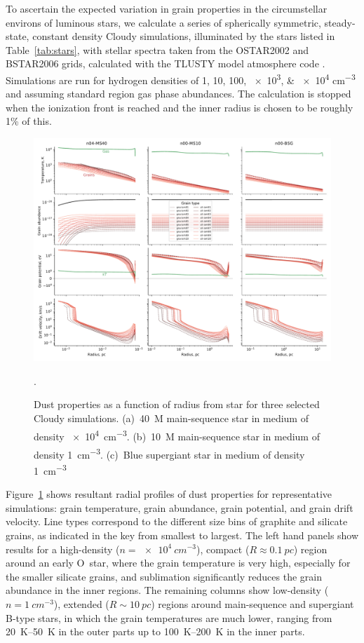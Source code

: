 To ascertain the expected variation in grain properties in the
circumstellar environs of luminous stars, we calculate a series of
spherically symmetric, steady-state, constant density Cloudy simulations,
illuminated by the stars listed in Table~\ref{tab:stars}, with stellar
spectra taken from the OSTAR2002 and BSTAR2006 grids, calculated with
the TLUSTY model atmosphere code \citep{Lanz:2003a, Lanz:2007a}.
Simulations are run for hydrogen densities of
\numlist{1;10;100;e3;e4} \si{cm^{-3}} and assuming standard \hii{} region
gas phase abundances.  The calculation is stopped when the ionization
front is reached and the inner radius is chosen to be roughly 1\% of this. 



\begin{figure}
  \includegraphics[width=\linewidth]{figs/multi-dustprops}
  \caption{Dust properties as a function of radius from star for three
    selected Cloudy simulations. (a)~\SI{40}{M_\odot} main-sequence star in
    medium of density \SI{e4}{cm^{-3}}. (b)~\SI{10}{M_\odot} main-sequence
    star in medium of density \SI{1}{cm^{-3}}. (c)~Blue supergiant
    star in medium of density \SI{1}{cm^{-3}}}.
  \label{fig:multi-dustprops}
\end{figure}
Figure~\ref{fig:multi-dustprops} shows resultant radial profiles of
dust properties for representative simulations: grain temperature, grain
abundance, grain potential, and grain drift velocity.  Line types
correspond to the different size bins of graphite and silicate grains,
as indicated in the key from smallest to largest. The left hand panels
show results for a high-density (\(n = \SI{e4}{cm^{-3}}\)), compact
(\(R \approx \SI{0.1}{pc}\)) region around an early O~star, where the grain
temperature is very high, especially for the smaller silicate grains,
and sublimation significantly reduces the grain abundance in the inner
regions.  The remaining columns show low-density
(\(n = \SI{1}{cm^{-3}}\)), extended (\(R \sim \SI{10}{pc}\)) regions
around main-sequence and supergiant B-type stars, in which the grain
temperatures are much lower, ranging from \SIrange{20}{50}{K} in the
outer parts up to \SIrange{100}{200}{K} in the inner parts.

